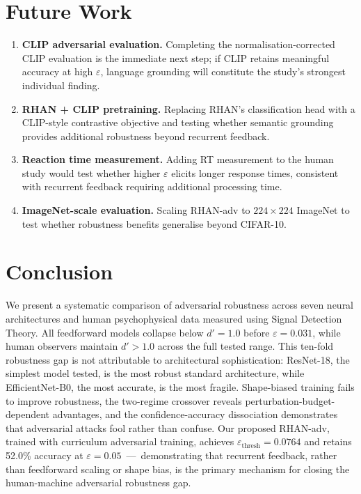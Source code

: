 \documentclass[12pt,a4paper]{article}
\begin{document}
\section{Future Work}
\label{sec:future}

\begin{enumerate}[leftmargin=1.5em]
  \item \textbf{CLIP adversarial evaluation.}
        Completing the normalisation-corrected CLIP evaluation is the
        immediate next step; if CLIP retains meaningful accuracy at high
        $\varepsilon$, language grounding will constitute the study's
        strongest individual finding.
  \item \textbf{RHAN + CLIP pretraining.}
        Replacing RHAN's classification head with a CLIP-style contrastive
        objective and testing whether semantic grounding provides additional
        robustness beyond recurrent feedback.
  \item \textbf{Reaction time measurement.}
        Adding RT measurement to the human study would test whether higher
        $\varepsilon$ elicits longer response times, consistent with
        recurrent feedback requiring additional processing time.
  \item \textbf{ImageNet-scale evaluation.}
        Scaling RHAN-adv to $224{\times}224$ ImageNet to test whether
        robustness benefits generalise beyond CIFAR-10.
\end{enumerate}

\section{Conclusion}
\label{sec:conclusion}

We present a systematic comparison of adversarial robustness across seven
neural architectures and human psychophysical data measured using Signal
Detection Theory.
All feedforward models collapse below $d'{=}1.0$ before $\varepsilon{=}0.031$,
while human observers maintain $d'{>}1.0$ across the full tested range.
This ten-fold robustness gap is not attributable to architectural
sophistication: ResNet-18, the simplest model tested, is the most robust
standard architecture, while EfficientNet-B0, the most accurate, is the
most fragile.
Shape-biased training fails to improve robustness, the two-regime crossover
reveals perturbation-budget-dependent advantages, and the confidence-accuracy
dissociation demonstrates that adversarial attacks fool rather than confuse.
Our proposed RHAN-adv, trained with curriculum adversarial training,
achieves $\varepsilon_{\text{thresh}}{=}0.0764$ and retains 52.0\% accuracy
at $\varepsilon{=}0.05$~---~demonstrating that recurrent feedback, rather than
feedforward scaling or shape bias, is the primary mechanism for closing the
human-machine adversarial robustness gap.
\end{document}
